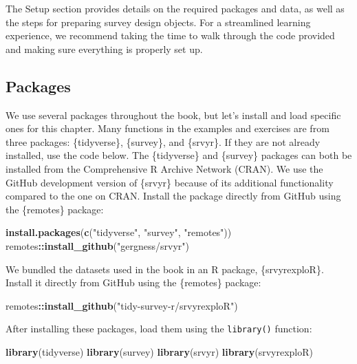 \documentclass[
]{krantz}
\makeatletter
\newenvironment{Shaded}{\begin{snugshade}}{\end{snugshade}}
\newcommand{\FunctionTok}[1]{\textcolor[rgb]{0.27,0.27,0.27}{\textbf{#1}}}
\newcommand{\NormalTok}[1]{#1}
\newcommand{\SpecialCharTok}[1]{\textcolor[rgb]{0.43,0.43,0.43}{\textbf{#1}}}
\newcommand{\StringTok}[1]{\textcolor[rgb]{0.5,0.5,0.5}{#1}}
\newenvironment{kframe}{%
\medskip{}
\setlength{\fboxsep}{.8em}
 \def\at@end@of@kframe{}%
 \ifinner\ifhmode%
  \def\at@end@of@kframe{\end{minipage}}%
  \begin{minipage}{\columnwidth}%
 \fi\fi%
 \def\FrameCommand##1{\hskip\@totalleftmargin \hskip-\fboxsep
 \colorbox{shadecolor}{##1}\hskip-\fboxsep
     \hskip-\linewidth \hskip-\@totalleftmargin \hskip\columnwidth}%
 \MakeFramed {\advance\hsize-\width
   \@totalleftmargin\z@ \linewidth\hsize
   \@setminipage}}%
 {\par\unskip\endMakeFramed%
 \at@end@of@kframe}
\renewenvironment{Shaded}{\begin{kframe}}{\end{kframe}}
\makeatother
\begin{document}
The Setup section provides details on the required packages and data, as well as the steps for preparing survey design objects. For a streamlined learning experience, we recommend taking the time to walk through the code provided and making sure everything is properly set up.

\hypertarget{packages}{%
\subsection{Packages}\label{packages}}

We use several packages throughout the book, but let's install and load specific ones for this chapter. Many functions in the examples and exercises are from three packages: \{tidyverse\}, \{survey\}, and \{srvyr\}. If they are not already installed, use the code below. The \{tidyverse\} and \{survey\} packages can both be installed from the Comprehensive R Archive Network (CRAN). We use the GitHub development version of \{srvyr\} because of its additional functionality compared to the one on CRAN. Install the package directly from GitHub using the \{remotes\} package:

\begin{Shaded}
\begin{Highlighting}[]
\FunctionTok{install.packages}\NormalTok{(}\FunctionTok{c}\NormalTok{(}\StringTok{"tidyverse"}\NormalTok{, }\StringTok{"survey"}\NormalTok{, }\StringTok{"remotes"}\NormalTok{))}
\NormalTok{remotes}\SpecialCharTok{::}\FunctionTok{install\_github}\NormalTok{(}\StringTok{"gergness/srvyr"}\NormalTok{)}
\end{Highlighting}
\end{Shaded}

We bundled the datasets used in the book in an R package, \{srvyrexploR\}. Install it directly from GitHub using the \{remotes\} package:

\begin{Shaded}
\begin{Highlighting}[]
\NormalTok{remotes}\SpecialCharTok{::}\FunctionTok{install\_github}\NormalTok{(}\StringTok{"tidy{-}survey{-}r/srvyrexploR"}\NormalTok{)}
\end{Highlighting}
\end{Shaded}

After installing these packages, load them using the \texttt{library()} function:

\begin{Shaded}
\begin{Highlighting}[]
\FunctionTok{library}\NormalTok{(tidyverse)}
\FunctionTok{library}\NormalTok{(survey)}
\FunctionTok{library}\NormalTok{(srvyr)}
\FunctionTok{library}\NormalTok{(srvyrexploR)}
\end{Highlighting}
\end{Shaded}
\end{document}
